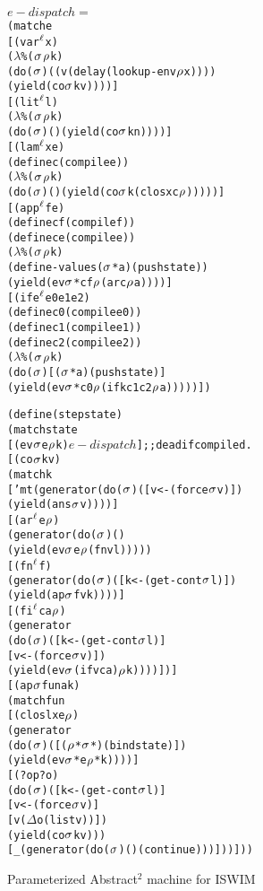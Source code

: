\documentclass[preprint]{sigplanconf}
\begin{document}
\begin{figure}
\begin{alltt}
\(e-dispatch =\)
 (match e
    [(var\(\superscript\ell\) x)
     (\(\lambda\)\% (\(\msto\) \(\menv\) k)
      (do (\(\msto\)) ((v (delay (lookup-env \(\menv\) x))))
        (yield (co \(\msto\) k v))))]
    [(lit\(\superscript\ell\) l)
     (\(\lambda\)\% (\(\msto\) \(\menv\) k)
      (do (\(\msto\)) () (yield (co \(\msto\) k n))))]
    [(lam\(\superscript\ell\) x e)
     (define c (compile e))
     (\(\lambda\)\% (\(\msto\) \(\menv\) k)
      (do (\(\msto\)) () (yield (co \(\msto\) k (clos x c \(\menv\))))))]
    [(app\(\superscript\ell\) f e)
     (define cf (compile f))
     (define ce (compile e))
     (\(\lambda\)\% (\(\msto\) \(\menv\) k)
      (define-values (\(\msto\)* a) (push state))
      (yield (ev \(\msto\)* cf \(\menv\) (ar c \(\menv\) a))))]
    [(ife\(\superscript\ell\) e0 e1 e2)
      (define c0 (compile e0))
      (define c1 (compile e1))
      (define c2 (compile e2))
      (\(\lambda\)\% (\(\msto\) \(\menv\) k)
        (do (\(\msto\)) [(\(\msto\)* a) (push state)]
         (yield (ev \(\msto\)* c0 \(\menv\) (ifk c1 c2 \(\menv\) a)))))])

  (define (step state)
    (match state
      [(ev \(\msto\) e \(\menv\) k) \(e-dispatch\)] ;; dead if compiled.
      [(co \(\msto\) k v)
       (match k
         ['mt (generator (do (\(\msto\)) ([v <- (force \(\msto\) v)])
           (yield (ans \(\msto\) v))))]
         [(ar\(\superscript\ell\) e \(\menv\))
          (generator (do (\(\msto\)) ()
            (yield (ev \(\msto\) e \(\menv\) (fn v l)))))
         [(fn\(\superscript\ell\) f)
          (generator (do (\(\msto\)) ([k <- (get-cont \(\msto\) l)])
           (yield (ap \(\msto\) f v k))))]
         [(fi\(\superscript\ell\) c a \(\menv\))
          (generator
           (do (\(\msto\)) ([k <- (get-cont \(\msto\) l)]
                    [v <- (force \(\msto\) v)])
             (yield (ev \(\msto\) (if v c a) \(\menv\) k))))])]
      [(ap \(\msto\) fun a k)
       (match fun
         [(clos l x e \(\menv\))
          (generator
           (do (\(\msto\)) ([(\(\menv\)* \(\msto\)*) (bind state)])
             (yield (ev \(\msto\)* e \(\menv\)* k))))]
         [(? op? o)
          (do (\(\msto\)) ([k <- (get-cont \(\msto\) l)]
                   [v <- (force \(\msto\) v)]
                   [v (\(\Delta\) o (list v))])
            (yield (co \(\msto\) k v)))
         [_ (generator (do (\(\msto\)) () (continue)))]))]))
\end{alltt}
\caption{Parameterized Abstract$^2$ machine for ISWIM}
\label{fig:paam}
\end{figure}
\end{document}
